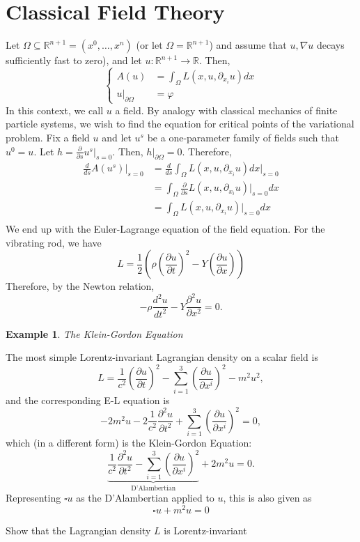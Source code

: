 \documentclass{article}
\newcommand{\R}{\mathbb R}
\newcommand{\vhi}{\varphi}
\newcommand{\pd}[1]{\frac{\partial}{\partial #1}}
\newcommand{\pdof}[2]{\frac{\partial #1}{\partial #2}}
\newtheorem{ex}{Example}
\begin{document}
\section{Classical Field Theory}
Let $\Omega\subseteq \R^{n+1} = (x^0,\dots,x^n)$ (or let $\Omega = \R^{n+1}$) and assume that $u,\nabla u$ decays sufficiently fast to zero), and let $u:\R^{n+1}\to \R$. Then,
\[\left\{\begin{aligned}
    A(u) &= \int_\Omega L(x,u,\partial_{x_i}u) dx\\
    u\big|_{\partial \Omega} &= \vhi
\end{aligned}\right.\]
In this context, we call $u$ a field. By analogy with classical mechanics of finite particle systems, we wish to find the equation for critical points of the variational problem. Fix a field $u$ and let $u^s$ be a one-parameter family of fields such that $u^0 = u$. Let $h=\pd{s}u^s\Big|_{s=0}$. Then, $h|_{\partial \Omega} = 0$. Therefore,
\begin{align*}
    \frac{d}{ds}A(u^s)\Big|_{s=0} &= \frac{d}{ds}\int_\Omega L(x,u,\partial_{x_i}u) dx\bigg|_{s=0}\\
    &=\int_\Omega \pd{s}L(x,u,\partial_{x_i}u)\Big|_{s=0} dx\\
    &=\int_\Omega L(x,u,\partial_{x_i}u)\Big|_{s=0} dx\\
\end{align*}
We end up with the Euler-Lagrange equation of the field equation. For the vibrating rod, we have
\[L = \frac{1}{2}\left(\rho\left(\pdof{u}{t}\right)^2 - Y\left(\pdof{u}{x}\right) \right)\]
Therefore, by the Newton relation,
\[-\rho \frac{d^2u}{dt^2} - Y\frac{\partial^2 u}{\partial x^2}  = 0.\]
\begin{ex}
    The Klein-Gordon Equation
\end{ex}
The most simple Lorentz-invariant Lagrangian density on a scalar field is
\[L = \frac{1}{c^2}\left(\pdof{u}{t}\right)^2 - \sum_{i=1}^3 \left(\pdof{u}{x^i}\right)^2 - m^2u^2,\]
and the corresponding E-L equation is 
\[-2m^2u - 2\frac{1}{c^2}\frac{\partial^2 u}{\partial t^2} + \sum_{i=1}^3 \left(\pdof{u}{x^i}\right)^2 = 0,\]
which (in a different form) is the Klein-Gordon Equation:
\[\underbrace{\frac{1}{c^2}\frac{\partial^2 u}{\partial t^2} - \sum_{i=1}^3 \left(\pdof{u}{x^i}\right)^2}_{\text{D'Alambertian}} + 2m^2u = 0.\]
Representing $\square u$ as the D'Alambertian applied to $u$, this is also given as
\[\square u + m^2 u = 0\]
\begin{exercise}
    Show that the Lagrangian density $L$ is Lorentz-invariant
\end{exercise}
\end{document}

